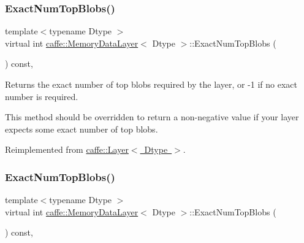 \subsubsection{\texorpdfstring{Exact\+Num\+Top\+Blobs()}{ExactNumTopBlobs()}\hspace{0.1cm}{\footnotesize\ttfamily [1/2]}}
{\footnotesize\ttfamily template$<$typename Dtype $>$ \\
virtual int \mbox{\hyperlink{classcaffe_1_1_memory_data_layer}{caffe\+::\+Memory\+Data\+Layer}}$<$ Dtype $>$\+::Exact\+Num\+Top\+Blobs (\begin{DoxyParamCaption}{ }\end{DoxyParamCaption}) const\hspace{0.3cm}{\ttfamily [inline]}, {\ttfamily [virtual]}}



Returns the exact number of top blobs required by the layer, or -\/1 if no exact number is required. 

This method should be overridden to return a non-\/negative value if your layer expects some exact number of top blobs. 

Reimplemented from \mbox{\hyperlink{classcaffe_1_1_layer_a64e2ca72c719e4b2f1f9216ccfb0d37f}{caffe\+::\+Layer$<$ Dtype $>$}}.

\mbox{\label{classcaffe_1_1_memory_data_layer_af714b4cbc022be1592ad26c300b63ae4}} 
\subsubsection{\texorpdfstring{Exact\+Num\+Top\+Blobs()}{ExactNumTopBlobs()}\hspace{0.1cm}{\footnotesize\ttfamily [2/2]}}
{\footnotesize\ttfamily template$<$typename Dtype $>$ \\
virtual int \mbox{\hyperlink{classcaffe_1_1_memory_data_layer}{caffe\+::\+Memory\+Data\+Layer}}$<$ Dtype $>$\+::Exact\+Num\+Top\+Blobs (\begin{DoxyParamCaption}{ }\end{DoxyParamCaption}) const\hspace{0.3cm}{\ttfamily [inline]}, {\ttfamily [virtual]}}



